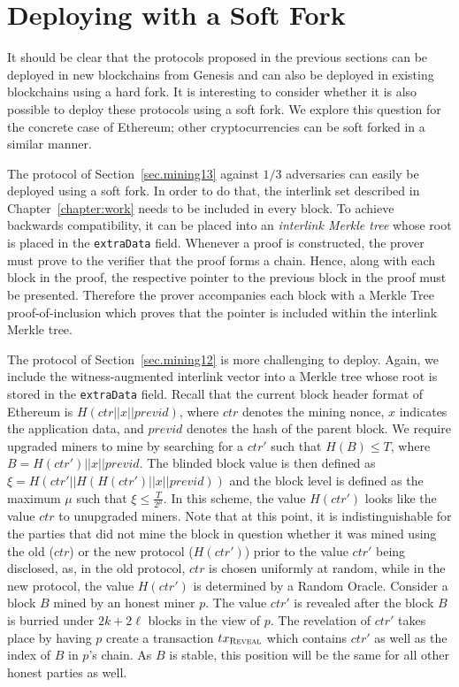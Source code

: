 \section{Deploying with a Soft Fork}\label{sec.deploy}

It should be clear that the protocols proposed in the previous sections can be
deployed in new blockchains from Genesis and can also be deployed in existing
blockchains using a hard fork. It is interesting to consider whether it is also
possible to deploy these protocols using a soft fork. We explore this question
for the concrete case of Ethereum; other cryptocurrencies can be soft forked in
a similar manner.

The protocol of Section~\ref{sec.mining13} against $1/3$ adversaries can easily
be deployed using a soft fork. In order to do that, the interlink set described
in Chapter~\ref{chapter:work} needs to be included in every block. To achieve
backwards compatibility, it can be placed into an \emph{interlink Merkle tree}
whose root is placed in the \texttt{extraData} field. Whenever a
proof is constructed, the prover must prove to the verifier that the proof forms
a chain. Hence, along with each block in the proof, the respective pointer to
the previous block in the proof must be presented. Therefore the prover
accompanies each block with a Merkle Tree proof-of-inclusion which
proves that the pointer is included within the interlink
Merkle tree.

The protocol of Section~\ref{sec.mining12} is more challenging to deploy. Again,
we include the witness-augmented interlink vector into a Merkle tree whose root
is stored in the \texttt{extraData} field.
Recall
that the current block header format of Ethereum is $H(ctr || x || previd)$,
where $ctr$ denotes the mining nonce, $x$ indicates the application data, and $previd$
denotes the hash of the parent block. We require upgraded miners to mine by
searching for a $ctr'$ such that $H(B) \leq T$, where
$B = H(ctr') || x || previd$. The blinded block
value is then defined as $\xi = H(ctr' || H(H(ctr') || x || previd))$ and the
block level is defined as the maximum $\mu$ such that
$\xi \leq \frac{T}{2^\mu}$. In this scheme, the value $H(ctr')$ looks like the
value $ctr$ to unupgraded miners. Note that at this point, it is
indistinguishable for the parties that did not mine the block in question
whether it was mined using the old ($ctr$) or the new protocol ($H(ctr')$) prior
to the value $ctr'$ being disclosed, as, in the old protocol, $ctr$ is chosen
uniformly at random, while in the new protocol, the value $H(ctr')$ is
determined by a Random Oracle. Consider a block $B$ mined by an honest miner
$p$. The value $ctr'$ is revealed after the block $B$ is burried under $2k + 2\ell$
blocks in the view of $p$. The revelation of $ctr'$ takes place by having $p$
create a transaction $tx_\textsc{Reveal}$ which contains
$ctr'$ as well as the index of $B$ in $p$'s chain. As $B$ is stable, this
position will be the same for all other honest parties as well.

